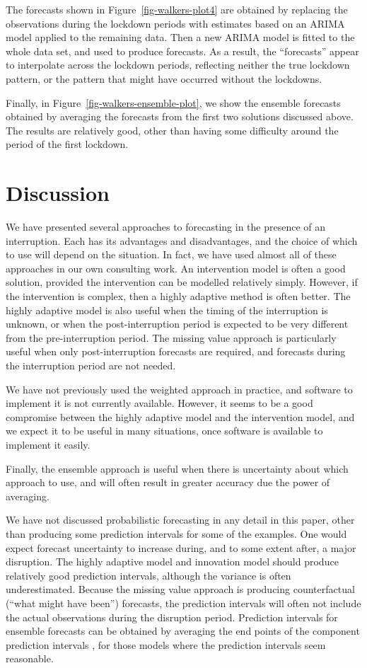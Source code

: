 \documentclass[11pt,a4paper,]{article}
\begin{document}
The forecasts shown in Figure~\ref{fig-walkers-plot4} are obtained by
replacing the observations during the lockdown periods with estimates
based on an ARIMA model applied to the remaining data. Then a new ARIMA
model is fitted to the whole data set, and used to produce forecasts. As
a result, the ``forecasts'' appear to interpolate across the lockdown
periods, reflecting neither the true lockdown pattern, or the pattern
that might have occurred without the lockdowns.

Finally, in Figure~\ref{fig-walkers-ensemble-plot}, we show the ensemble
forecasts obtained by averaging the forecasts from the first two
solutions discussed above. The results are relatively good, other than
having some difficulty around the period of the first lockdown.

\section{Discussion}\label{discussion}

We have presented several approaches to forecasting in the presence of
an interruption. Each has its advantages and disadvantages, and the
choice of which to use will depend on the situation. In fact, we have
used almost all of these approaches in our own consulting work. An
intervention model is often a good solution, provided the intervention
can be modelled relatively simply. However, if the intervention is
complex, then a highly adaptive method is often better. The highly
adaptive model is also useful when the timing of the interruption is
unknown, or when the post-interruption period is expected to be very
different from the pre-interruption period. The missing value approach
is particularly useful when only post-interruption forecasts are
required, and forecasts during the interruption period are not needed.

We have not previously used the weighted approach in practice, and
software to implement it is not currently available. However, it seems
to be a good compromise between the highly adaptive model and the
intervention model, and we expect it to be useful in many situations,
once software is available to implement it easily.

Finally, the ensemble approach is useful when there is uncertainty about
which approach to use, and will often result in greater accuracy due the
power of averaging.

We have not discussed probabilistic forecasting in any detail in this
paper, other than producing some prediction intervals for some of the
examples. One would expect forecast uncertainty to increase during, and
to some extent after, a major disruption. The highly adaptive model and
innovation model should produce relatively good prediction intervals,
although the variance is often underestimated. Because the missing value
approach is producing counterfactual (``what might have been'')
forecasts, the prediction intervals will often not include the actual
observations during the disruption period. Prediction intervals for
ensemble forecasts can be obtained by averaging the end points of the
component prediction intervals \autocite{lichtendahl2013better}, for
those models where the prediction intervals seem reasonable.

\printbibliography[title=References]
\end{document}
